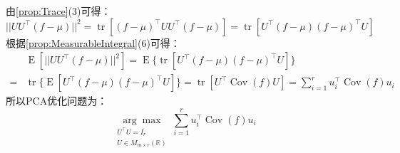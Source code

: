 由\cref{prop:Trace}(3)可得：
\begin{equation*}
	||UU^{\top}(f-\mu)||^2=\operatorname{tr}[(f-\mu)^{\top}UU^{\top}(f-\mu)]=\operatorname{tr}[U^{\top}(f-\mu)(f-\mu)^{\top}U]
\end{equation*}
根据\cref{prop:MeasurableIntegral}(6)可得：
\begin{align*}
	&\operatorname{E}[||UU^{\top}(f-\mu)||^2]=\operatorname{E}\{\operatorname{tr}[U^{\top}(f-\mu)(f-\mu)^{\top}U]\} \\
	=&\operatorname{tr}\{\operatorname{E}[U^{\top}(f-\mu)(f-\mu)^{\top}U]\}=\operatorname{tr}[U^{\top}\operatorname{Cov}(f)U]=\sum_{i=1}^{r}u_i^{\top}\operatorname{Cov}(f)u_i
\end{align*}
所以PCA优化问题为：
\begin{equation*}
	\underset{\substack{U^{\top}U=I_r\\U\in M_{m\times r}(\mathbb{R})}}{\arg\max}\;\sum_{i=1}^{r}u_i^{\top}\operatorname{Cov}(f)u_i
\end{equation*}

